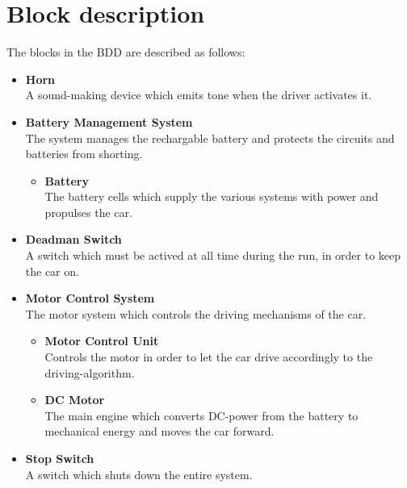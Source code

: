 \section{Block description}
The blocks in the BDD are described as follows:

\begin{itemize}
	\item \textbf{Horn}\\
	A sound-making device which emits tone when the driver activates it.
	\item \textbf{Battery Management System}\\
	The system manages the rechargable battery and protects the circuits and batteries from shorting.
	\begin{itemize}
		\item \textbf{Battery}\\
		The battery cells which supply the various systems with power and propulses the car.
	\end{itemize}
	\item \textbf{Deadman Switch}\\
	A switch which must be actived at all time during the run, in order to keep the car on.
	\item \textbf{Motor Control System}\\
	The motor system which controls the driving mechanisms of the car.
	\begin{itemize}
		\item \textbf{Motor Control Unit}\\
		Controls the motor in order to let the car drive accordingly to the driving-algorithm.
		\item \textbf{DC Motor}\\
		The main engine which converts DC-power from the battery to mechanical energy and moves the car forward.
	\end{itemize}
	\item \textbf{Stop Switch}\\
	A switch which shuts down the entire system.
\end{itemize}